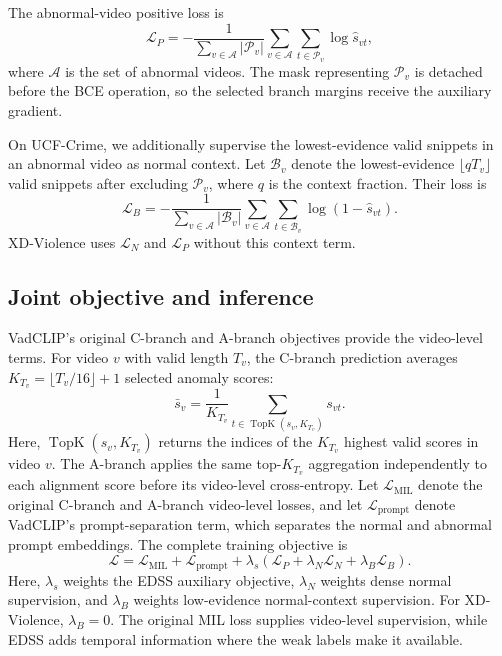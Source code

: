 \documentclass[preprint,12pt]{elsarticle}
\begin{document}
The abnormal-video positive loss is
\begin{equation}
\mathcal{L}_{P}=-\frac{1}{\sum_{v\in\mathcal{A}}|\mathcal{P}_v|}\sum_{v\in\mathcal{A}}
\sum_{t\in\mathcal{P}_v}\log \hat{s}_{vt},
\end{equation}
where $\mathcal{A}$ is the set of abnormal videos. The mask representing $\mathcal{P}_v$ is detached before the BCE operation, so the selected branch margins receive the auxiliary gradient.

On UCF-Crime, we additionally supervise the lowest-evidence valid snippets in an abnormal video as normal context. Let $\mathcal{B}_v$ denote the lowest-evidence $\lfloor qT_v\rfloor$ valid snippets after excluding $\mathcal{P}_v$, where $q$ is the context fraction. Their loss is
\begin{equation}
\mathcal{L}_{B}=-\frac{1}{\sum_{v\in\mathcal{A}}|\mathcal{B}_v|}\sum_{v\in\mathcal{A}}
\sum_{t\in\mathcal{B}_v}\log\left(1-\hat{s}_{vt}\right).
\end{equation}
XD-Violence uses $\mathcal{L}_{N}$ and $\mathcal{L}_{P}$ without this context term.

\subsection{Joint objective and inference}
VadCLIP's original C-branch and A-branch objectives provide the video-level terms. For video $v$ with valid length $T_v$, the C-branch prediction averages $K_{T_v}=\lfloor T_v/16\rfloor+1$ selected anomaly scores:
\begin{equation}
    \bar{s}_v=\frac{1}{K_{T_v}}\sum_{t\in\operatorname{TopK}(s_v,K_{T_v})}s_{vt}.
\end{equation}
Here, $\operatorname{TopK}(s_v,K_{T_v})$ returns the indices of the $K_{T_v}$ highest valid scores in video $v$. The A-branch applies the same top-$K_{T_v}$ aggregation independently to each alignment score before its video-level cross-entropy. Let $\mathcal{L}_{\mathrm{MIL}}$ denote the original C-branch and A-branch video-level losses, and let $\mathcal{L}_{\mathrm{prompt}}$ denote VadCLIP's prompt-separation term, which separates the normal and abnormal prompt embeddings. The complete training objective is
\begin{equation}
    \mathcal{L}=\mathcal{L}_{\mathrm{MIL}}+\mathcal{L}_{\mathrm{prompt}}
    +\lambda_s\left(\mathcal{L}_{P}+\lambda_N\mathcal{L}_{N}+\lambda_B\mathcal{L}_{B}\right).
    \label{eq:total}
\end{equation}
Here, $\lambda_s$ weights the EDSS auxiliary objective, $\lambda_N$ weights dense normal supervision, and $\lambda_B$ weights low-evidence normal-context supervision. For XD-Violence, $\lambda_B=0$. The original MIL loss supplies video-level supervision, while EDSS adds temporal information where the weak labels make it available.
\end{document}
